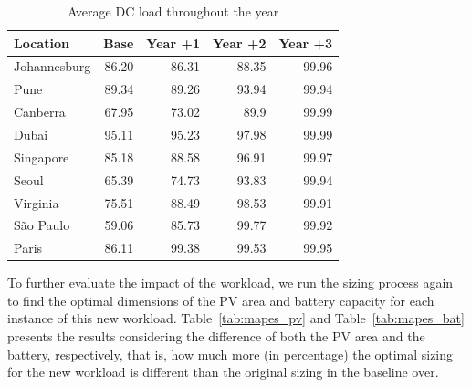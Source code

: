 \begin{table}[H]
  
  \caption{Average DC load throughout the year }\label{tab:dcu_years} \centering

  \begin{tabular}{|l|r|r|r|r|}
   \hline
    
  \textbf{Location} &   \textbf{Base} & \textbf{Year +1} & \textbf{Year +2} & \textbf{Year +3}  \\
  \hline
  Johannesburg & 86.20 & 86.31 & 88.35 & 99.96 \\
  \hline
  Pune  &  89.34 & 89.26 & 93.94 & 99.94  \\
  \hline
  Canberra  & 67.95 & 73.02 & 89.9 & 99.99 \\
  \hline
  Dubai   &  95.11 & 95.23 & 97.98 & 99.99  \\
  \hline
  Singapore &  85.18 & 88.58 & 96.91 & 99.97 \\
  \hline     
  Seoul    &  65.39  & 74.73 &93.83 & 99.94    \\
  \hline
  Virginia   &  75.51 & 88.49 & 98.53 & 99.91 \\
  \hline
  São Paulo   &  59.06 & 85.73 & 99.77 & 99.92 \\
  \hline 
  Paris    &  86.11 & 99.38 & 99.53 & 99.95   \\
  \hline  

\end{tabular}
\end{table}




To further evaluate the impact of the workload, we run the sizing process again to find the optimal dimensions of the PV area and battery capacity for each instance of this new workload. Table~\ref{tab:mapes_pv} and Table~\ref{tab:mapes_bat} presents the results considering the difference of both the PV area and the battery, respectively, that is, how much more (in percentage) the optimal sizing for the new workload is different than the original sizing in the baseline over.

